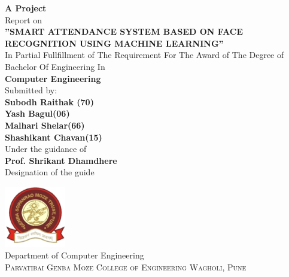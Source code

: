 \begin{titlepage}

\begin{center}

\textup{\small {\bf A  Project} \\ Report on} \\[0.3in]

\Large \textbf {”SMART ATTENDANCE SYSTEM BASED ON FACE
RECOGNITION USING MACHINE LEARNING”}\\[0.7in]


       

\normalsize In Partial Fullfillment of The Requirement For
The Award of The Degree of
Bachelor Of Engineering In
 \\[0.2in]
\Large \textbf{Computer Engineering}\\[0.7in]
Submitted by:\\
\Large \textbf {Subodh Raithak (70)\\
                                Yash Bagul(06)\\
                                Malhari Shelar(66)\\
                                Shashikant Chavan(15)}
                                \\[0.7in]

\vspace{.2in}
Under the guidance of\\[0.2in]
\textbf{Prof. Shrikant Dhamdhere}\\
Designation of the guide



\vspace{.3in}

\includegraphics[width=0.2\textwidth]{logo.png}\\[0.1in]
\Large{Department of Computer Engineering}\\
\normalsize
\textsc{Parvatibai Genba Moze College of Engineering
Wagholi, Pune
 }\\


\end{center}
\end{titlepage}
